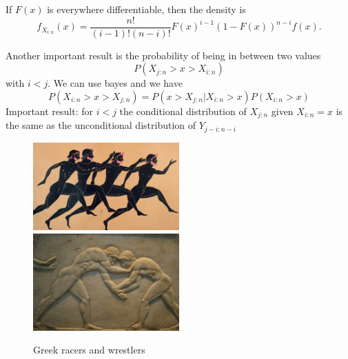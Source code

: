 \documentclass[11pt]{article}
\begin{document}
If $F(x)$ is everywhere differentiable, then the density is
\begin{equation}
  f_{X_{i:n}} (x) = \frac{n!}{(i-1)!(n-i)!} F(x)^{i-1} (1-F(x))^{n-i} f(x). 
\end{equation}

Another important result is the probability of being in between two values
\begin{equation}
  P (X_{j:n} > x > X_{i:n})
\end{equation}
with $i<j$. We can use bayes and we have
\begin{equation}
  P (X_{i:n} > x > X_{j:n}) = P ( x > X_{j:n} | X_{i:n} > x ) P (X_{i:n} > x)
\end{equation}
Important result: for $i< j$ the conditional distribution of $X_{j:n}$ given $X_{i:n}=x$ is the same as the unconditional distribution of $Y_{j-i: n-i}$

\begin{figure}
\centering
\includegraphics[width=0.5\textwidth]{img/racer.jpg}\\
\includegraphics[width=0.5\textwidth]{img/wrestler.jpg}
\caption{Greek racers and wrestlers}
\end{figure}


\tableofcontents


\newpage
\singlespacing

\end{document}
